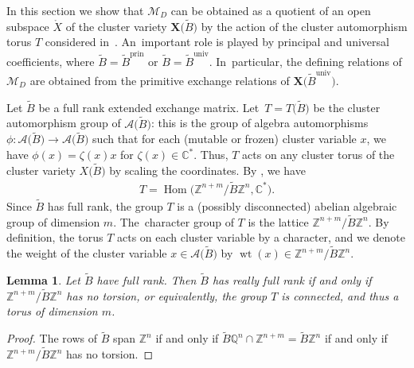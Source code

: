 \documentclass[pdftex]{sigma}%
\def\C{{\mathbb C}}
\def\Z{{\mathbb Z}}
\def\Q{{\mathbb Q}}
\def\A{{\mathcal{A}}}
\def\Xo{{\mathring{X}}}
\def\Hom{\operatorname{Hom}}
\def\prin{{\operatorname{prin}}}
\def\univ{{\operatorname{univ}}}
\def\tB{{\tilde B}}
\def\wt{\operatorname{wt}}
\def\M{{\mathcal{M}}}
\def\tB{{\tilde B}}
\def\X{{\mathbf X}}
\numberwithin{equation}{section}
\newtheorem{Lemma}[Theorem]{Lemma}
\begin{document}
In this section we show that $\M_D$ can be obtained as a quotient of an open subspace $\Xo$ of the cluster variety $\X\big(\tB\big)$ by the action of the cluster automorphism torus $T$ considered in~\cite{LS}. An~important role is played by principal and universal coefficients, where $\tB = \tB^\prin$ or \mbox{$\tB=\tB^\univ$}. In~particular, the defining relations of $\M_D$ are obtained from the primitive exchange relations of $\X\big(\tB^\univ\big)$.

\bigskip{}
Let $\tB$ be a full rank extended exchange matrix. Let~$T = T\big(\tB\big)$ be the cluster automorphism group \cite{LS} of $\A\big(\tB\big)$: this is the group of algebra automorphisms $\phi\colon \A\big(\tB\big) \to \A\big(\tB\big)$ such that for each (mutable or frozen) cluster variable $x$, we have $\phi(x) = \zeta(x) x$ for $\zeta(x) \in \C^\ast$. Thus, $T$ acts on any cluster torus of the cluster variety $X\big(\tB\big)$ by scaling the coordinates. By \cite[Proposition~5.1]{LS}, we have
\begin{gather}\label{eq:auto}
T = \Hom\big(\Z^{n+m}/\tB \Z^n, \C^\ast\big).
\end{gather}
Since $\tB$ has full rank, the group $T$ is a (possibly disconnected) abelian algebraic group of dimension $m$. The~character group of $T$ is the lattice $\Z^{n+m}/\tB \Z^n$. By definition, the torus $T$ acts on each cluster variable by a character, and we denote the weight of the cluster variable $x \in \A\big(\tB\big)$ by $\wt(x) \in \Z^{n+m}/\tB \Z^n$.

\begin{Lemma}
Let $\tB$ have full rank. Then $\tB$ has really full rank if and only if $\Z^{n+m}/\tB \Z^n$ has no torsion, or equivalently, the group $T$ is connected, and thus a torus of dimension $m$.
\end{Lemma}
\begin{proof}
The rows of $\tB$ span $\Z^n$ if and only if $\tB \Q^n \cap \Z^{n+m} = \tB \Z^n$ if and only if $\Z^{n+m}/\tB \Z^n$ has no torsion.
\end{proof}
\end{document}

